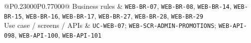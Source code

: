 \begin{longtable}{@{}P{0.23000\SRSWidth}P{0.77000\SRSWidth}@{}}
Business rules & \texttt{WEB-\allowbreak{}BR-\allowbreak{}07}, \texttt{WEB-\allowbreak{}BR-\allowbreak{}08}, \texttt{WEB-\allowbreak{}BR-\allowbreak{}14}, \texttt{WEB-\allowbreak{}BR-\allowbreak{}15}, \texttt{WEB-\allowbreak{}BR-\allowbreak{}16}, \texttt{WEB-\allowbreak{}BR-\allowbreak{}17}, \texttt{WEB-\allowbreak{}BR-\allowbreak{}27}, \texttt{WEB-\allowbreak{}BR-\allowbreak{}28}, \texttt{WEB-\allowbreak{}BR-\allowbreak{}29} \\[3pt]
Use case /\allowbreak{} screens /\allowbreak{} APIs & \texttt{UC-\allowbreak{}WEB-\allowbreak{}07}; \texttt{WEB-\allowbreak{}SCR-\allowbreak{}ADMIN-\allowbreak{}PROMOTIO\allowbreak{}NS}; \texttt{WEB-\allowbreak{}API-\allowbreak{}098}, \texttt{WEB-\allowbreak{}API-\allowbreak{}100}, \texttt{WEB-\allowbreak{}API-\allowbreak{}101} \\[3pt]
\end{longtable}
\endgroup

